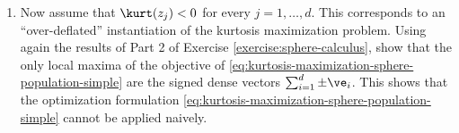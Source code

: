 \documentclass[../../book-main.tex]{subfiles}
\begin{document}
\begin{exercise}
\begin{enumerate}
        (\textit{Hint: count the number of positive and negative eigenvalues of the Riemannian Hessian \eqref{eq:exercise-riemann-hess-sphere} at each critical point.})
        \item Now assume that $\kurt(z_j) < 0$ for every $j =1, \dots, d$. This corresponds to an ``over-deflated'' instantiation of the kurtosis maximization problem. Using again the results of Part 2 of Exercise \ref{exercise:sphere-calculus}, show that the only local maxima of the objective of \eqref{eq:kurtosis-maximization-sphere-population-simple} are the signed dense vectors $\sum_{i=1}^d \pm \ve_i$.
        This shows that the optimization formulation \eqref{eq:kurtosis-maximization-sphere-population-simple} cannot be applied naively.
    \end{enumerate}
\end{exercise}

\begin{exercise}\label{exercise:fast-ica-convergence}
\end{exercise}

\end{document}
